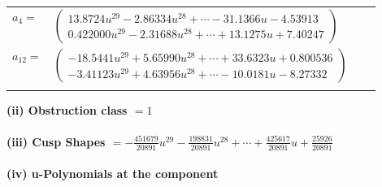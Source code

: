 \documentclass[1p]{elsarticle_modified}
\theoremstyle{definition}
\begin{document}
\begin{tabular}{m{7pt} m{180pt} m{7pt} m{180pt} }
\flushright $a_{4}=$&$\begin{pmatrix}13.8724 u^{29}-2.86334 u^{28}+\cdots-31.1366 u-4.53913\\0.422000 u^{29}-2.31688 u^{28}+\cdots+13.1275 u+7.40247\end{pmatrix}$ \\
\flushright $a_{12}=$&$\begin{pmatrix}-18.5441 u^{29}+5.65990 u^{28}+\cdots+33.6323 u+0.800536\\-3.41123 u^{29}+4.63956 u^{28}+\cdots-10.0181 u-8.27332\end{pmatrix}$\\&\end{tabular}
\flushleft \textbf{(ii) Obstruction class $= 1$}\\~\\
\flushleft \textbf{(iii) Cusp Shapes $= -\frac{451679}{20891} u^{29}-\frac{198831}{20891} u^{28}+\cdots+\frac{425617}{20891} u+\frac{25926}{20891}$}\\~\\
\newpage\renewcommand{\arraystretch}{1}
\flushleft \textbf{(iv) u-Polynomials at the component}\newline \\
\end{document}
